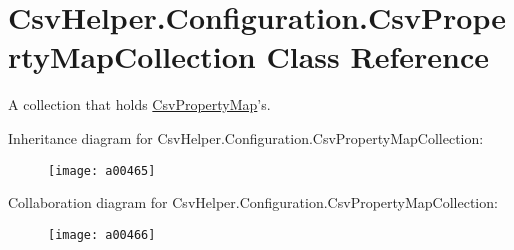 \hypertarget{a00070}{\section{Csv\-Helper.\-Configuration.\-Csv\-Property\-Map\-Collection Class Reference}
\label{a00070}
}


A collection that holds \hyperlink{a00069}{Csv\-Property\-Map}'s.  




Inheritance diagram for Csv\-Helper.\-Configuration.\-Csv\-Property\-Map\-Collection\-:
\nopagebreak
\begin{figure}[H]
\begin{center}
\leavevmode
\texttt{[image: a00465]}
\end{center}
\end{figure}


Collaboration diagram for Csv\-Helper.\-Configuration.\-Csv\-Property\-Map\-Collection\-:
\nopagebreak
\begin{figure}[H]
\begin{center}
\leavevmode
\texttt{[image: a00466]}
\end{center}
\end{figure}
